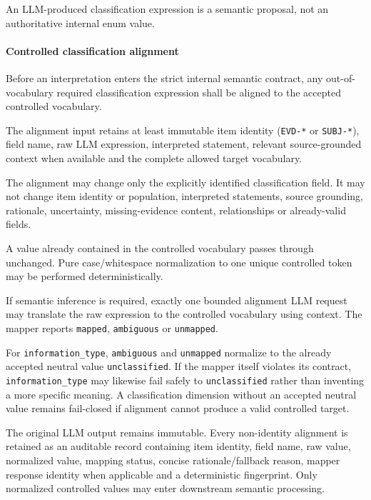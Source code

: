 An LLM-produced classification expression is a semantic proposal, not an authoritative internal enum value.

\hypertarget{controlled-classification-alignment}{%
\paragraph{Controlled classification alignment}\label{controlled-classification-alignment}}

Before an interpretation enters the strict internal semantic contract, any out-of-vocabulary required classification expression shall be aligned to the accepted controlled vocabulary.

The alignment input retains at least immutable item identity (\texttt{EVD-*} or \texttt{SUBJ-*}), field name, raw LLM expression, interpreted statement, relevant source-grounded context when available and the complete allowed target vocabulary.

The alignment may change only the explicitly identified classification field. It may not change item identity or population, interpreted statements, source grounding, rationale, uncertainty, missing-evidence content, relationships or already-valid fields.

A value already contained in the controlled vocabulary passes through unchanged. Pure case/whitespace normalization to one unique controlled token may be performed deterministically.

If semantic inference is required, exactly one bounded alignment LLM request may translate the raw expression to the controlled vocabulary using context. The mapper reports \texttt{mapped}, \texttt{ambiguous} or \texttt{unmapped}.

For \texttt{information\_type}, \texttt{ambiguous} and \texttt{unmapped} normalize to the already accepted neutral value \texttt{unclassified}. If the mapper itself violates its contract, \texttt{information\_type} may likewise fail safely to \texttt{unclassified} rather than inventing a more specific meaning. A classification dimension without an accepted neutral value remains fail-closed if alignment cannot produce a valid controlled target.

The original LLM output remains immutable. Every non-identity alignment is retained as an auditable record containing item identity, field name, raw value, normalized value, mapping status, concise rationale/fallback reason, mapper response identity when applicable and a deterministic fingerprint. Only normalized controlled values may enter downstream semantic processing.

